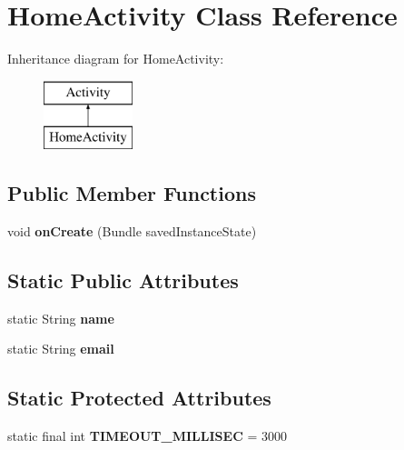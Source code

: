 \hypertarget{classapp_1_1localization_1_1_home_activity}{\section{Home\-Activity Class Reference}
\label{classapp_1_1localization_1_1_home_activity}
}
Inheritance diagram for Home\-Activity\-:\begin{figure}[H]
\begin{center}
\leavevmode
\includegraphics[height=2.000000cm]{classapp_1_1localization_1_1_home_activity}
\end{center}
\end{figure}
\subsection*{Public Member Functions}
\begin{DoxyCompactItemize}
\item 
\hypertarget{classapp_1_1localization_1_1_home_activity_a85e87cb5ced88dff7c8173ecc4f636d1}{void {\bfseries on\-Create} (Bundle saved\-Instance\-State)}\label{classapp_1_1localization_1_1_home_activity_a85e87cb5ced88dff7c8173ecc4f636d1}

\end{DoxyCompactItemize}
\subsection*{Static Public Attributes}
\begin{DoxyCompactItemize}
\item 
\hypertarget{classapp_1_1localization_1_1_home_activity_a9a2326f35466e54c36c070829245c557}{static String {\bfseries name}}\label{classapp_1_1localization_1_1_home_activity_a9a2326f35466e54c36c070829245c557}

\item 
\hypertarget{classapp_1_1localization_1_1_home_activity_ac120cf8981125377a85fe62e1557a509}{static String {\bfseries email}}\label{classapp_1_1localization_1_1_home_activity_ac120cf8981125377a85fe62e1557a509}

\end{DoxyCompactItemize}
\subsection*{Static Protected Attributes}
\begin{DoxyCompactItemize}
\item 
\hypertarget{classapp_1_1localization_1_1_home_activity_af5858805af6e7dae14f55e3f4d0e0f9e}{static final int {\bfseries T\-I\-M\-E\-O\-U\-T\-\_\-\-M\-I\-L\-L\-I\-S\-E\-C} = 3000}\label{classapp_1_1localization_1_1_home_activity_af5858805af6e7dae14f55e3f4d0e0f9e}

\end{DoxyCompactItemize}


